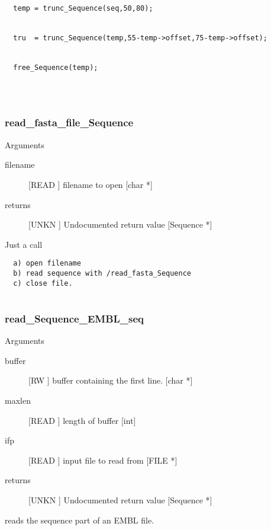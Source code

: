 \begin{verbatim}
  temp = trunc_Sequence(seq,50,80);


  tru  = trunc_Sequence(temp,55-temp->offset,75-temp->offset);


  free_Sequence(temp);




\end{verbatim}
\subsubsection{read_fasta_file_Sequence}

Arguments
\begin{description}
\item[filename] [READ ] filename to open  [char *]
\item[returns] [UNKN ] Undocumented return value [Sequence *]
\end{description}
Just a call
\begin{verbatim}
  a) open filename
  b) read sequence with /read_fasta_Sequence
  c) close file.


\end{verbatim}
\subsubsection{read_Sequence_EMBL_seq}

Arguments
\begin{description}
\item[buffer] [RW   ] buffer containing the first line. [char *]
\item[maxlen] [READ ] length of buffer [int]
\item[ifp] [READ ] input file to read from [FILE *]
\item[returns] [UNKN ] Undocumented return value [Sequence *]
\end{description}
reads the sequence part of an EMBL file.


